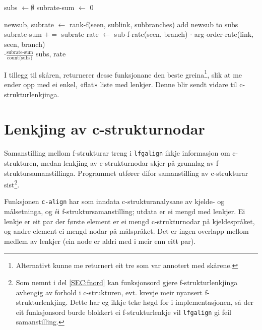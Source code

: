 \documentclass[12pt,a4paper,oneside,draft]{report}
\begin{document}
      \begin{algorithm}[]
      subs $\gets \emptyset$ \;
      subrate-sum $\gets$ 0 \;
      \caption{rank-branch(seen, link, branch)}
      \label{algo:rank-branch}
         {
          newsub, subrate $\gets$ rank-f(seen, sublink, subbranches) \;
          add newsub to subs \;
          subrate-sum $+=$ subrate \;
        }
        rate $\gets$ sub-f-rate(seen, branch) $\cdot$ arg-order-rate(link, seen, branch) \\
        \hfill $\cdot \frac{\text{subrate-sum}}{\text{count(subs)}}$ \;
        \Return subs, rate \;
      \end{algorithm}

I tillegg til skåren, returnerer desse funksjonane den beste
greina\footnote{Alternativt kunne me returnert eit tre som var annotert med
        skårene. }, slik at me ender opp med ei enkel, «flat» liste med
lenkjer. Denne blir sendt vidare til c-strukturlenkjinga.


\section{Lenkjing av c-strukturnodar}
\label{sec-4.3}

Samanstilling mellom f-strukturar treng i \texttt{lfgalign} ikkje informasjon
om c-strukturen, medan lenkjing av c-strukturnodar skjer på grunnlag
av f-struktursamanstillinga. Programmet utfører difor samanstilling av
c-strukturar sist\footnote{Som nemnt i del \ref{SEC:fnord} kan funksjonsord gjere
       f-strukturlenkjinga avhengig av forhold i c-strukturen,
       evt. krevje meir nyansert f-strukturlenkjing. Dette har eg
       ikkje teke høgd for i implementasjonen, så der eit funksjonsord
       burde blokkert ei f-strukturlenkje vil \texttt{lfgalign} gi feil
       samanstilling. }.

Funksjonen \texttt{c-align} har som inndata c-strukturanalysane av kjelde- og
målsetninga, og éi f-struktursamanstilling; utdata er ei mengd med
lenkjer. Ei lenkje er eit par der første element er ei mengd
c-strukturnodar på kjeldespråket, og andre element ei mengd nodar på
målspråket. Det er ingen overlapp mellom medlem av lenkjer (ein node
er aldri med i meir enn eitt par).
\end{document}
